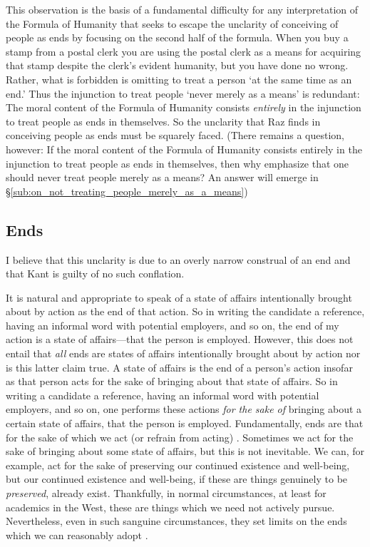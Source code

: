 \documentclass[12pt]{article}
\begin{document}
This observation is the basis of a fundamental difficulty for any interpretation of the Formula of Humanity that seeks to escape the unclarity of conceiving of people as ends by focusing on the second half of the formula. When you buy a stamp from a postal clerk you are using the postal clerk as a means for acquiring that stamp despite the clerk's evident humanity, but you have done no wrong. Rather, what is forbidden is omitting to treat a person `at the same time as an end.' Thus the injunction to treat people `never merely as a means' is redundant: The moral content of the Formula of Humanity consists \emph{entirely} in the injunction to treat people as ends in themselves. So the unclarity that Raz finds in conceiving people as ends must be squarely faced. (There remains a question, however: If the moral content of the Formula of Humanity consists entirely in the injunction to treat people as ends in themselves, then why emphasize that one should never treat people merely as a means? An answer will emerge in \S \ref{sub:on_not_treating_people_merely_as_a_means})

\subsection{Ends} \label{sub:ends} %

I believe that this unclarity is due to an overly narrow construal of an end and that Kant is guilty of no such conflation. %

It is natural and appropriate to speak of a state of affairs intentionally brought about by action as the end of that action. So in writing the candidate a reference, having an informal word with potential employers, and so on, the end of my action is a state of affairs---that the person is employed. However, this does not entail that \emph{all} ends are states of affairs intentionally brought about by action nor is this latter claim true. A state of affairs is the end of a person's action insofar as that person acts for the sake of bringing about that state of affairs. So in writing a candidate a reference, having an informal word with potential employers, and so on, one performs these actions \emph{for the sake of} bringing about a certain state of affairs, that the person is employed. Fundamentally, ends are that for the sake of which we act (or refrain from acting) \citep[see, inter alia,][]{Velleman:2006nx}. Sometimes we act for the sake of bringing about some state of affairs, but this is not inevitable. We can, for example, act for the sake of preserving our continued existence and well-being, but our continued existence and well-being, if these are things genuinely to be \emph{preserved}, already exist. Thankfully, in normal circumstances, at least for academics in the West, these are things which we need not actively pursue. Nevertheless, even in such sanguine circumstances, they set limits on the ends which we can reasonably adopt \citep[see][88-94]{Korsgaard:1996md}. 
\end{document}
